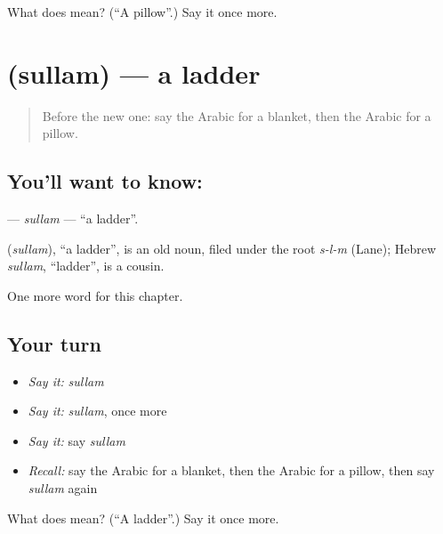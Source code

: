 \begin{tcolorbox}[breakable,colback=teal!4,colframe=teal!35!black,title={Before you move on}]
What does  mean? (\textquotedblleft{}A pillow\textquotedblright{}.) Say it once more.
\end{tcolorbox}
\section[\texorpdfstring{\ar{سلم} (sullam)}{سلم (sullam)}]{ (sullam) — a ladder}

\label{lesson:AR-C123-sullam}



\begin{quote}
Before the new one: say the Arabic for a blanket, then the Arabic for a pillow.
\end{quote}

\subsection*{You'll want to know: }
\textbf{} — \emph{sullam} — \textquotedblleft{}a ladder\textquotedblright{}.

\begin{cousinweb}
\textbf{} (\emph{sullam}), \textquotedblleft{}a ladder\textquotedblright{}, is an old noun, filed under the root \emph{s-l-m} (Lane); Hebrew \emph{sullam}, \textquotedblleft{}ladder\textquotedblright{}, is a cousin.
\end{cousinweb}

\begin{grammarlens}[title={What you've built}]
One more word for this chapter.
\end{grammarlens}

\subsection*{Your turn}
\begin{itemize}
\raggedright
  \item \emph{Say it:} \emph{sullam}
  \item \emph{Say it:} \emph{sullam}, once more
  \item \emph{Say it:} say \emph{sullam}
  \item \emph{Recall:} say the Arabic for a blanket, then the Arabic for a pillow, then say \emph{sullam} again
\end{itemize}

\begin{tcolorbox}[breakable,colback=teal!4,colframe=teal!35!black,title={Before you move on}]
What does  mean? (\textquotedblleft{}A ladder\textquotedblright{}.) Say it once more.
\end{tcolorbox}
